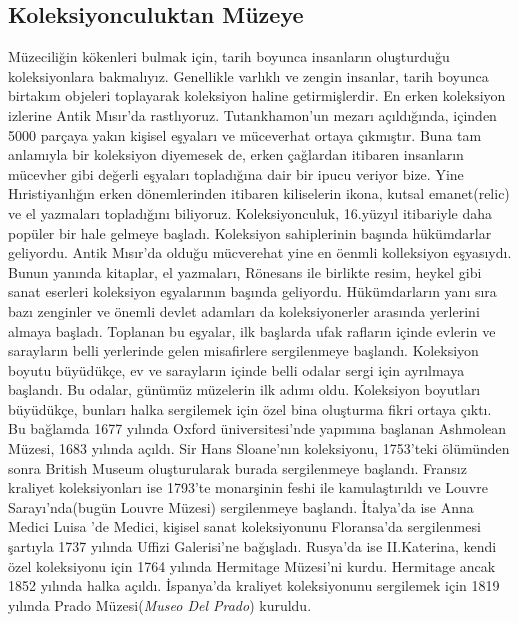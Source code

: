 \subsection{Koleksiyonculuktan Müzeye}
\indent\indent Müzeciliğin kökenleri bulmak için, tarih boyunca insanların oluşturduğu koleksiyonlara bakmalıyız. Genellikle varlıklı ve zengin insanlar, tarih boyunca birtakım objeleri toplayarak koleksiyon haline getirmişlerdir. En erken koleksiyon izlerine Antik Mısır'da rastlıyoruz. Tutankhamon'un mezarı açıldığında, içinden 5000 parçaya yakın kişisel eşyaları ve müceverhat ortaya çıkmıştır. Buna tam anlamıyla bir koleksiyon diyemesek de, erken çağlardan itibaren insanların mücevher gibi değerli eşyaları topladığına dair bir ipucu veriyor bize. Yine Hıristiyanlığın erken dönemlerinden itibaren kiliselerin ikona, kutsal emanet(relic) ve el yazmaları topladığını biliyoruz.\newline
\indent Koleksiyonculuk, 16.yüzyıl itibariyle daha popüler bir hale gelmeye başladı. Koleksiyon sahiplerinin başında hükümdarlar geliyordu. Antik Mısır'da olduğu mücverehat yine en öenmli kolleksiyon eşyasıydı. Bunun yanında kitaplar, el yazmaları, Rönesans ile birlikte resim, heykel gibi sanat eserleri koleksiyon eşyalarının başında geliyordu. Hükümdarların yanı sıra bazı zenginler ve önemli devlet adamları da koleksiyonerler arasında yerlerini almaya başladı. Toplanan bu eşyalar, ilk başlarda ufak rafların içinde evlerin ve sarayların belli yerlerinde gelen misafirlere sergilenmeye başlandı. Koleksiyon boyutu büyüdükçe, ev ve sarayların içinde belli odalar sergi için ayrılmaya başlandı. Bu odalar, günümüz müzelerin ilk adımı oldu.\newline
\indent Koleksiyon boyutları büyüdükçe, bunları halka sergilemek için özel bina oluşturma fikri ortaya çıktı. Bu bağlamda 1677 yılında Oxford üniversitesi'nde yapımına başlanan Ashmolean Müzesi, 1683 yılında açıldı. Sir Hans Sloane'nın koleksiyonu, 1753'teki ölümünden sonra British Museum oluşturularak burada sergilenmeye başlandı. Fransız kraliyet koleksiyonları ise 1793'te monarşinin feshi ile kamulaştırıldı ve Louvre Sarayı'nda(bugün Louvre Müzesi) sergilenmeye başlandı. İtalya'da ise Anna Medici Luisa 'de Medici, kişisel sanat koleksiyonunu Floransa'da sergilenmesi şartıyla 1737 yılında Uffizi Galerisi'ne bağışladı. Rusya'da ise II.Katerina, kendi özel koleksiyonu için 1764 yılında Hermitage Müzesi'ni kurdu. Hermitage ancak 1852 yılında halka açıldı. İspanya'da kraliyet koleksiyonunu sergilemek için 1819 yılında Prado Müzesi(\textit{Museo Del Prado}) kuruldu.